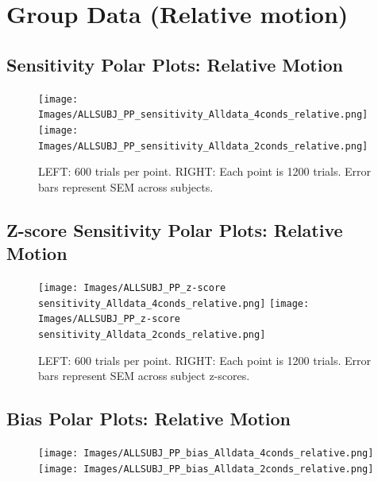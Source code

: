 \documentclass[11pt]{article} %
\begin{document}
\newpage
\section{Group Data (Relative motion)}
\subsection{Sensitivity Polar Plots: Relative Motion}
\begin{figure}[H]
\centering %
\texttt{[image: Images/ALLSUBJ\_PP\_sensitivity\_Alldata\_4conds\_relative.png]}
\texttt{[image: Images/ALLSUBJ\_PP\_sensitivity\_Alldata\_2conds\_relative.png]}
\caption{LEFT: 600 trials per point. RIGHT: Each point is 1200 trials. Error bars represent SEM across subjects.}
\end{figure}
\subsection{Z-score Sensitivity Polar Plots: Relative Motion}
\begin{figure}[H]
\centering %
\texttt{[image: Images/ALLSUBJ\_PP\_z-score sensitivity\_Alldata\_4conds\_relative.png]}
\texttt{[image: Images/ALLSUBJ\_PP\_z-score sensitivity\_Alldata\_2conds\_relative.png]}
\caption{LEFT: 600 trials per point. RIGHT: Each point is 1200 trials. Error bars represent SEM across subject z-scores.}
\end{figure}
\subsection{Bias Polar Plots: Relative Motion}
\begin{figure}[H]
\centering %
\texttt{[image: Images/ALLSUBJ\_PP\_bias\_Alldata\_4conds\_relative.png]}
\texttt{[image: Images/ALLSUBJ\_PP\_bias\_Alldata\_2conds\_relative.png]}
\end{figure}
\end{document}
